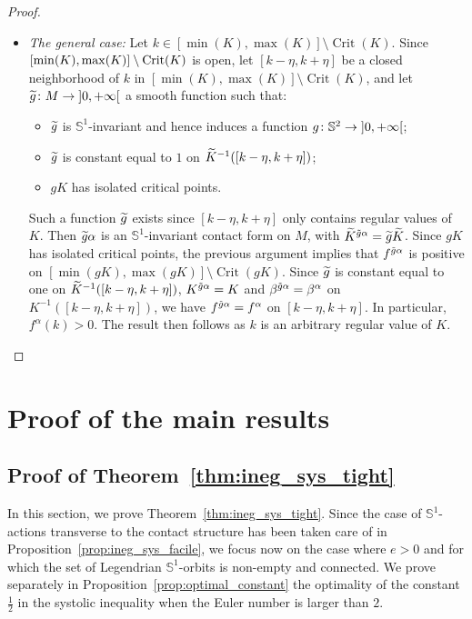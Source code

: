 \documentclass[AHL,Unicode,longabstracts]{cedram}
\DeclareMathOperator{\Crit}{Crit}
\newcommand{\bbS}{\mathbb{S}}
\renewcommand*{\to}{\mathchoice{\longrightarrow}{\rightarrow}{\rightarrow}{\rightarrow}}
\let\oldtilde\tilde
\renewcommand*{\tilde}[1]{\mathchoice{\widetilde{#1}}{\widetilde{#1}}{\oldtilde{#1}}{\oldtilde{#1}}}
\newcommand{\bbS}{\mathbb{S}}
\begin{document}
\begin{proof}
\begin{itemize}
\item
\emph{The general case: } Let $k \in [\min(K), \max(K)] \setminus \Crit(K)$. Since $[\min(K),\linebreak \max(K)] \setminus \Crit(K)$ is open, let $[k-\eta, k + \eta]$ be a closed neighborhood of $k$ in $[\min(K), \max(K)] \setminus \Crit(K)$, and let $\tilde g \colon M \to\mathopen{]}0, +\infty\mathclose{[}$ a smooth function such that:
\begin{itemize}
\item $\tilde g$ is $\bbS^1$-invariant and hence induces a function $g \colon \bbS^2 \to\mathopen{]}0, + \infty\mathclose{[}$;
\item $\tilde g$ is constant equal to $1$ on $\tilde K^{-1}([k-\eta, k + \eta])$;
\item $g K$ has isolated critical points.
\end{itemize}
Such a function $\tilde g$ exists since $[k-\eta, k + \eta]$ only contains regular values of~$K$. Then $\tilde g \alpha$ is an $\bbS^1$-invariant contact form on $M$, with $\tilde K^{\tilde g \alpha} = \tilde g \tilde K$. Since $gK$ has isolated critical points, the previous argument implies that $f^{\tilde g \alpha}$ is positive on $[\min(gK), \max(gK)] \setminus \Crit(gK)$. Since $\tilde g$ is constant equal to one on $\tilde K^{-1}([k-\eta, k + \eta])$, $K^{\tilde g \alpha} = K$ and $\beta^{ \tilde g \alpha} = \beta^\alpha$ on $K^{-1}([k-\eta, k + \eta])$, we have $f^{\tilde g \alpha} = f^\alpha$ on $[k-\eta, k + \eta]$. In particular, $f^\alpha(k) > 0$. The result then follows as $k$ is an arbitrary regular value of $K$.\qedhere
\end{itemize}
\end{proof}

\section{Proof of the main results}

\subsection{Proof of Theorem~\ref{thm:ineg_sys_tight}} In this section, we prove Theorem~\ref{thm:ineg_sys_tight}. Since the case of $\bbS^1$-actions transverse to the contact structure has been taken care of in Proposition~\ref{prop:ineg_sys_facile}, we focus now on the case where $e > 0$ and for which the set of Legendrian $\bbS^1$-orbits is non-empty and connected. We prove separately in Proposition~\ref{prop:optimal_constant} the optimality of the constant $\frac{1}{2}$ in the systolic inequality when the Euler number is larger than $2$.
\end{document}

